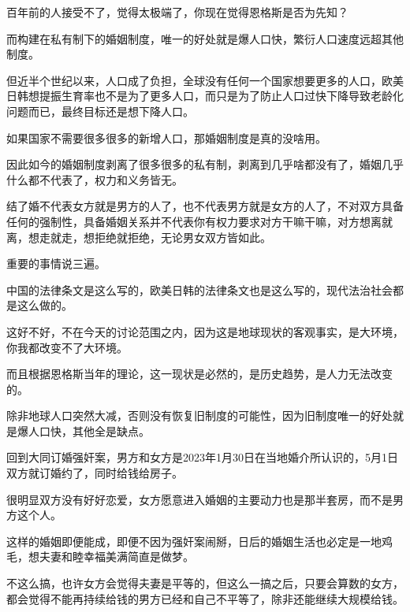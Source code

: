 \documentclass[UTF8,11pt,oneside]{ctexart}
\begin{document}
百年前的人接受不了，觉得太极端了，你现在觉得恩格斯是否为先知？

而构建在私有制下的婚姻制度，唯一的好处就是爆人口快，繁衍人口速度远超其他制度。

但近半个世纪以来，人口成了负担，全球没有任何一个国家想要更多的人口，欧美日韩想提振生育率也不是为了更多人口，而只是为了防止人口过快下降导致老龄化问题而已，最终目标还是想下降人口。

如果国家不需要很多很多的新增人口，那婚姻制度是真的没啥用。

因此如今的婚姻制度剥离了很多很多的私有制，剥离到几乎啥都没有了，婚姻几乎什么都不代表了，权力和义务皆无。

结了婚不代表女方就是男方的人了，也不代表男方就是女方的人了，不对双方具备任何的强制性，具备婚姻关系并不代表你有权力要求对方干嘛干嘛，对方想离就离，想走就走，想拒绝就拒绝，无论男女双方皆如此。

重要的事情说三遍。




中国的法律条文是这么写的，欧美日韩的法律条文也是这么写的，现代法治社会都是这么做的。

这好不好，不在今天的讨论范围之内，因为这是地球现状的客观事实，是大环境，你我都改变不了大环境。

而且根据恩格斯当年的理论，这一现状是必然的，是历史趋势，是人力无法改变的。

除非地球人口突然大减，否则没有恢复旧制度的可能性，因为旧制度唯一的好处就是爆人口快，其他全是缺点。

回到大同订婚强奸案，男方和女方是2023年1月30日在当地婚介所认识的，5月1日双方就订婚约了，同时给钱给房子。

很明显双方没有好好恋爱，女方愿意进入婚姻的主要动力也是那半套房，而不是男方这个人。

这样的婚姻即便能成，即便不因为强奸案闹掰，日后的婚姻生活也必定是一地鸡毛，想夫妻和睦幸福美满简直是做梦。




不这么搞，也许女方会觉得夫妻是平等的，但这么一搞之后，只要会算数的女方，都会觉得不能再持续给钱的男方已经和自己不平等了，除非还能继续大规模给钱。
\end{document}
